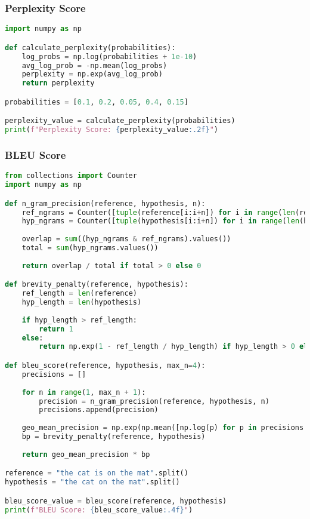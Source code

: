 \newpage

\subsubsection{Perplexity Score}

\begin{lstlisting}[language=Python]
import numpy as np

def calculate_perplexity(probabilities):
    log_probs = np.log(probabilities + 1e-10)
    avg_log_prob = -np.mean(log_probs)
    perplexity = np.exp(avg_log_prob)
    return perplexity

probabilities = [0.1, 0.2, 0.05, 0.4, 0.15]

perplexity_value = calculate_perplexity(probabilities)
print(f"Perplexity Score: {perplexity_value:.2f}")
\end{lstlisting}

\newpage

\subsubsection{BLEU Score}

\begin{lstlisting}[language=Python]
from collections import Counter
import numpy as np

def n_gram_precision(reference, hypothesis, n):
    ref_ngrams = Counter([tuple(reference[i:i+n]) for i in range(len(reference) - n + 1)])
    hyp_ngrams = Counter([tuple(hypothesis[i:i+n]) for i in range(len(hypothesis) - n + 1)])
    
    overlap = sum((hyp_ngrams & ref_ngrams).values())
    total = sum(hyp_ngrams.values())
    
    return overlap / total if total > 0 else 0

def brevity_penalty(reference, hypothesis):
    ref_length = len(reference)
    hyp_length = len(hypothesis)
    
    if hyp_length > ref_length:
        return 1
    else:
        return np.exp(1 - ref_length / hyp_length) if hyp_length > 0 else 0

def bleu_score(reference, hypothesis, max_n=4):
    precisions = []
    
    for n in range(1, max_n + 1):
        precision = n_gram_precision(reference, hypothesis, n)
        precisions.append(precision)
    
    geo_mean_precision = np.exp(np.mean([np.log(p) for p in precisions if p > 0]))
    bp = brevity_penalty(reference, hypothesis)
    
    return geo_mean_precision * bp

reference = "the cat is on the mat".split()
hypothesis = "the cat on the mat".split()

bleu_score_value = bleu_score(reference, hypothesis)
print(f"BLEU Score: {bleu_score_value:.4f}")
\end{lstlisting}

